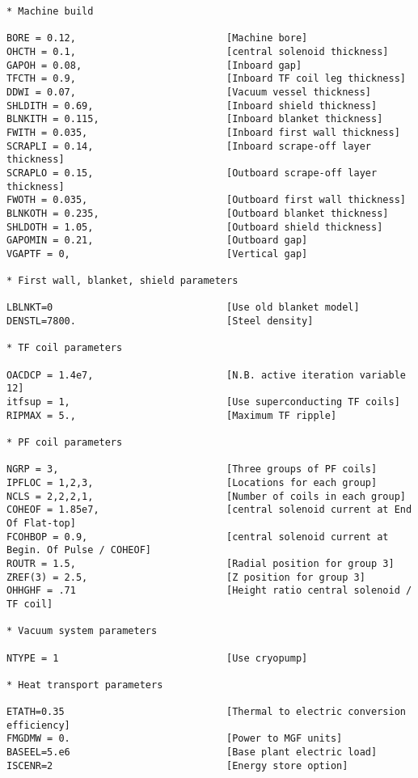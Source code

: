 \documentclass[11pt,a4paper]{report}
\begin{document}
\begin{verbatim}
* Machine build

BORE = 0.12,                          [Machine bore]
OHCTH = 0.1,                          [central solenoid thickness]
GAPOH = 0.08,                         [Inboard gap]
TFCTH = 0.9,                          [Inboard TF coil leg thickness]
DDWI = 0.07,                          [Vacuum vessel thickness]
SHLDITH = 0.69,                       [Inboard shield thickness]
BLNKITH = 0.115,                      [Inboard blanket thickness]
FWITH = 0.035,                        [Inboard first wall thickness]
SCRAPLI = 0.14,                       [Inboard scrape-off layer thickness]
SCRAPLO = 0.15,                       [Outboard scrape-off layer thickness]
FWOTH = 0.035,                        [Outboard first wall thickness]
BLNKOTH = 0.235,                      [Outboard blanket thickness]
SHLDOTH = 1.05,                       [Outboard shield thickness]
GAPOMIN = 0.21,                       [Outboard gap]
VGAPTF = 0,                           [Vertical gap]

* First wall, blanket, shield parameters

LBLNKT=0                              [Use old blanket model]
DENSTL=7800.                          [Steel density]

* TF coil parameters

OACDCP = 1.4e7,                       [N.B. active iteration variable 12]
itfsup = 1,                           [Use superconducting TF coils]
RIPMAX = 5.,                          [Maximum TF ripple]

* PF coil parameters

NGRP = 3,                             [Three groups of PF coils]
IPFLOC = 1,2,3,                       [Locations for each group]
NCLS = 2,2,2,1,                       [Number of coils in each group]
COHEOF = 1.85e7,                      [central solenoid current at End Of Flat-top]
FCOHBOP = 0.9,                        [central solenoid current at Begin. Of Pulse / COHEOF]
ROUTR = 1.5,                          [Radial position for group 3]
ZREF(3) = 2.5,                        [Z position for group 3]
OHHGHF = .71                          [Height ratio central solenoid / TF coil]

* Vacuum system parameters

NTYPE = 1                             [Use cryopump]

* Heat transport parameters

ETATH=0.35                            [Thermal to electric conversion efficiency]
FMGDMW = 0.                           [Power to MGF units]
BASEEL=5.e6                           [Base plant electric load]
ISCENR=2                              [Energy store option]


\end{verbatim}
\end{document}
